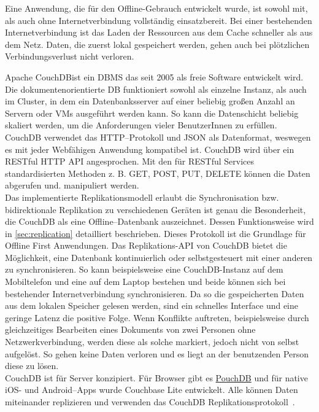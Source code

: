 Eine Anwendung, die für den Offline-Gebrauch entwickelt wurde, ist sowohl mit, als auch ohne Internetverbindung vollständig einsatzbereit. Bei einer bestehenden Internetverbindung ist das Laden der Ressourcen aus dem Cache schneller als aus dem Netz. Daten, die zuerst lokal gespeichert werden, gehen auch bei plötzlichen Verbindungsverlust nicht verloren.
%
%

%
%

%
%
%
%
Apache CouchDB\tm ist ein \gls{DBMS} das seit 2005 als freie Software entwickelt wird. Die dokumentenorientierte \gls{DB} funktioniert sowohl als einzelne Instanz, als auch im Cluster, in dem ein Datenbanksserver auf einer beliebig großen Anzahl an Servern oder \glspl{VM} ausgeführt werden kann. So kann die Datenschicht beliebig skaliert werden, um die Anforderungen vieler BenutzerInnen zu erfüllen. CouchDB verwendet das \gls{HTTP}--Protokoll und \gls{JSON} als Datenformat, weswegen es mit jeder Webfähigen Anwendung kompatibel ist. CouchDB wird über ein \gls{REST}ful \gls{HTTP} \gls{API} angesprochen. Mit den für \gls{REST}ful Services standardisierten Methoden z. B. GET, POST, PUT, DELETE können die Daten abgerufen und. manipuliert werden.\\
Das implementierte Replikationsmodell erlaubt die Synchronisation bzw. bidirektionale Replikation zu verschiedenen Geräten ist genau die Besonderheit, die CouchDB als eine Offline--Datenbank auszeichnet. Dessen Funktionsweise wird in \autoref{sec:replication} detailliert beschrieben. Dieses Protokoll ist die Grundlage für Offline First Anwendungen.
Das Replikations-API von CouchDB bietet die Möglichkeit, eine Datenbank kontinuierlich oder selbstgesteuert mit einer anderen zu synchronisieren.
So kann beispielsweise eine CouchDB-Instanz auf dem Mobiltelefon und eine auf dem Laptop bestehen und beide können sich bei bestehender Internetverbindung synchronisieren. Da so die gespeicherten Daten aus dem lokalen Speicher gelesen werden, sind ein schnelles Interface und eine geringe Latenz die positive Folge. Wenn Konflikte auftreten, beispielsweise durch gleichzeitiges Bearbeiten eines Dokuments von zwei Personen ohne Netzwerkverbindung, werden diese als solche markiert, jedoch nicht von selbst aufgelöst. So gehen keine Daten verloren und es liegt an der benutzenden Person diese zu lösen. \\
CouchDB ist für Server konzipiert. Für Browser gibt es \hyperref[sub:pouch]{PouchDB} und für native iOS- und Android--\glspl{App} wurde Couchbase Lite entwickelt. Alle können Daten miteinander replizieren und verwenden das CouchDB Replikationsprotokoll~\cite{couch}.
